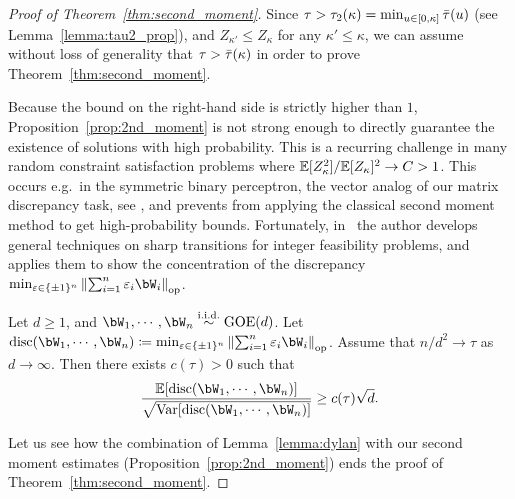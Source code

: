 \begin{proof}[Proof of Theorem~\ref{thm:second_moment}]
Since $\tau > \tau_2(\kappa) = \min_{u \in [0,\kappa]} {\bar{\tau}}(u)$ (see Lemma~\ref{lemma:tau2_prop}), 
and $Z_{\kappa'} \leq Z_\kappa$ for any $\kappa' \leq \kappa$, we can assume without loss of generality that $\tau > {\bar{\tau}}(\kappa)$ in order to prove Theorem~\ref{thm:second_moment}.

\myskip
Because the bound on the right-hand side is strictly higher than $1$, Proposition~\ref{prop:2nd_moment} is not strong enough to directly guarantee the existence of solutions with high probability.
This is a recurring challenge in many random constraint satisfaction problems where
$\mathbb{E}[Z_\kappa^2]/\mathbb{E}[Z_\kappa]^2 \to C > 1$. 
This occurs e.g.\ 
in the symmetric binary perceptron, the vector analog of our matrix discrepancy task, see \cite{abbe2022proof}, 
and prevents from applying the classical second moment method to get high-probability bounds.
Fortunately, in~\cite{altschuler2023zero} the author develops general techniques on sharp transitions for integer feasibility problems, 
and applies them to show the concentration of the discrepancy $\min_{\eps \in \{\pm 1\}^n} \left\|\sum_{i=1}^n \eps_i \bW_i \right\|_\op$.
\begin{lemma}
    \label{lemma:dylan}
    Let $d \geq 1$, and $\bW_1, \cdots, \bW_n \iid \GOE(d)$.
    Let $\disc(\bW_1, \cdots, \bW_n) \coloneqq \min_{\eps \in \{\pm 1\}^n} \left\|\sum_{i=1}^n \eps_i \bW_i \right\|_\op$. 
    Assume that $n/d^2 \to \tau$ as $d \to \infty$. Then there exists $c(\tau) > 0$ such that
    \begin{align*}
        \frac{\EE[\disc(\bW_1, \cdots, \bW_n)]}{\sqrt{\Var[\disc(\bW_1, \cdots, \bW_n)]}} \geq c(\tau) \sqrt{d}.
    \end{align*}
\end{lemma}
\noindent
Let us see how the combination of Lemma~\ref{lemma:dylan} with our second moment estimates (Proposition~\ref{prop:2nd_moment}) 
ends the proof of Theorem~\ref{thm:second_moment}.


\end{proof}
